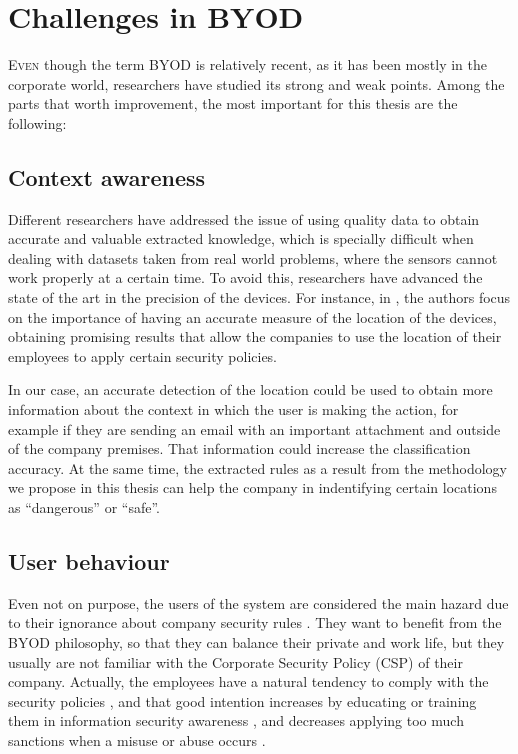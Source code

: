 \section{Challenges in BYOD}
\label{sec:intro:challenges}

\lettrine{E}{ven} though the term BYOD is relatively recent, as it has been mostly in the corporate world, researchers have studied its strong and weak points. Among the parts that worth improvement, the most important for this thesis are the following:

\subsection{Context awareness}
\label{subsec:context}

Different researchers have addressed the issue of using quality data to obtain accurate and valuable extracted knowledge, which is specially difficult when dealing with datasets taken from real world problems, where the sensors cannot work properly at a certain time. To avoid this, researchers have advanced the state of the art in the precision of the devices. 
For instance, in \cite{rios2015mobile}, the authors focus on the importance of having an accurate measure of the location of the devices, obtaining promising results that allow the companies to use the location of their employees to apply certain security policies.

In our case, an accurate detection of the location could be used to obtain more information about the context in which the user is making the action, for example if they are sending an email with an important attachment and outside of the company premises.
 That information could increase the classification accuracy. At the same time, the extracted rules as a result from the methodology we propose in this thesis can help the company in indentifying certain locations as ``dangerous'' or ``safe''.

\subsection{User behaviour}
\label{subsec:behav}

Even not on purpose, the users of the system are considered the main hazard due to their ignorance about company security rules  \cite{Adams_users99}. They want to benefit from the BYOD philosophy, so that they can balance their private and work life, but they usually are not familiar with the Corporate Security Policy (CSP) of their company.  Actually, the employees have a natural tendency to comply with the security policies \cite{Sip_SecPriv07,Bulg_SecPol10,AlOmari_SecPol12}, and that good intention increases by educating or training them in information security awareness  \cite{Shaw_SecAware09}, and decreases applying too much sanctions when a misuse or abuse occurs \cite{Her_SecPol09}.

